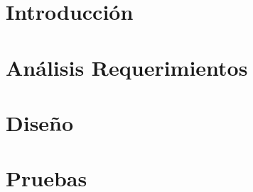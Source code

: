 \section{Introducción}


\section{Análisis Requerimientos}


\section{Diseño}


\section{Pruebas}


